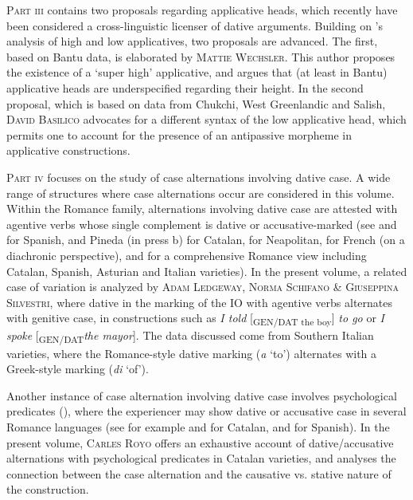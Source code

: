 \documentclass[output=paper,modfonts,nonflat,colorlinks,citecolor=brown]{langsci/langscibook}
\begin{document}
{\textsc{Part iii}} contains two proposals regarding applicative heads, which recently have been considered a cross-linguistic licenser of dative arguments. Building on \citeauthor{Pylkkänen2002}'s \citeyear{Pylkkänen2002, Pylkkänen2008} analysis of high and low applicatives, two proposals are advanced. The first, based on Bantu data, is elaborated by {\textsc{Mattie Wechsler}}. This author proposes the existence of a ‘super high’ applicative, and argues that (at least in Bantu) applicative heads are underspecified regarding their height. In the second proposal, which is based on data from Chukchi, West Greenlandic and Salish, {\textsc{David Basilico}} advocates for a different syntax of the low applicative head, which permits one to account for the presence of an antipassive morpheme in applicative constructions. 



{\textsc{Part iv}} focuses on the study of case alternations involving dative case. A wide range of structures where case alternations occur are considered in this volume. Within the Romance family, alternations involving dative case are attested with agentive verbs whose single complement is dative or accusative-marked (see \citealt{FernándezOrdóñez1999} and \citealt{Sáez2009} for Spanish, \citealt{Ramos2005,Morant2008,PinedaRoyo2017} and Pineda (in press b)  for Catalan, \citealt{Ledgeway2000} for Neapolitan, \citealt{Troberg2008} for French (on a diachronic perspective), and \citealt{Pineda2016} for a comprehensive Romance view including Catalan, Spanish, Asturian and Italian varieties). In the present volume, a related case of variation is analyzed by {\textsc{Adam Ledgeway, Norma Schifano \& Giuseppina Silvestri}}, where dative in the marking of the IO with agentive verbs alternates with genitive case, in constructions such as {\textit{I told}} [{\textsubscript{GEN/DAT the boy}}]{ \textit{to go}} or {\textit{I spoke}} [{\textsubscript{GEN/DAT}\textit{the mayor}}]. The data discussed come from Southern Italian varieties, where the Romance-style dative marking ({\textit{a}} ‘to’) alternates with a Greek-style marking ({\textit{di}} ‘of’). 



Another instance of case alternation involving dative case involves psychological predicates ({\citealt{BellettiRizzi1988}}), where the experiencer may show dative or accusative case in several Romance languages (see for example \citealt{CabréMateu1998,PinedaRoyo2017} and \citealt{Royo2017} for Catalan, and \citealt{FernándezOrdóñez1999} for Spanish). In the present volume, {\textsc{Carles Royo}} offers an exhaustive account of dative/accusative alternations with psychological predicates in Catalan varieties, and analyses the connection between the case alternation and the causative vs. stative nature of the construction.
\end{document}
